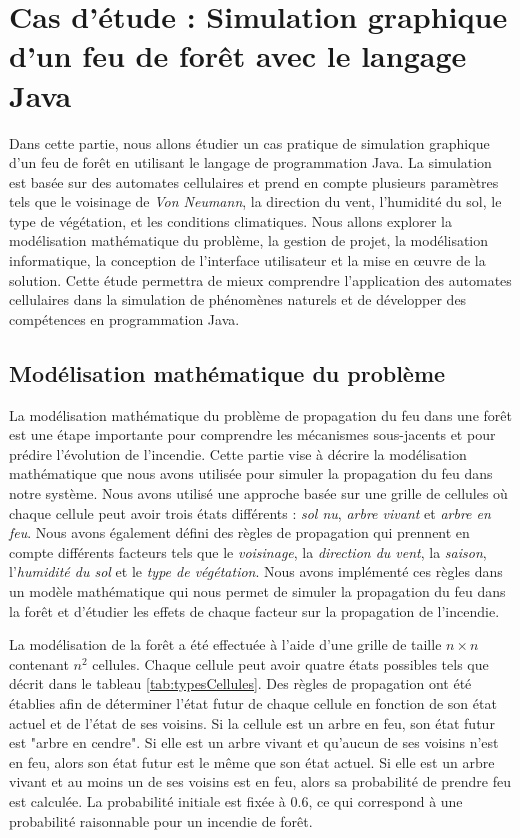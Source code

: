 \section{Cas d’étude : Simulation graphique d’un feu de forêt avec le langage Java}

Dans cette partie, nous allons étudier un cas pratique de simulation graphique d'un feu de forêt en utilisant le langage de programmation Java. La simulation est basée sur des automates cellulaires et prend en compte plusieurs paramètres tels que le voisinage de \textit{Von Neumann}, la direction du vent, l'humidité du sol, le type de végétation, et les conditions climatiques. Nous allons explorer la modélisation mathématique du problème, la gestion de projet, la modélisation informatique, la conception de l'interface utilisateur et la mise en œuvre de la solution. Cette étude permettra de mieux comprendre l'application des automates cellulaires dans la simulation de phénomènes naturels et de développer des compétences en programmation Java.

\subsection{Modélisation mathématique du problème}
\label{sec:modélisationMath}

La modélisation mathématique du problème de propagation du feu dans une forêt est une étape importante pour comprendre les mécanismes sous-jacents et pour prédire l'évolution de l'incendie. Cette partie vise à décrire la modélisation mathématique que nous avons utilisée pour simuler la propagation du feu dans notre système. Nous avons utilisé une approche basée sur une grille de cellules où chaque cellule peut avoir trois états différents : \textit{sol nu}, \textit{arbre vivant} et \textit{arbre en feu}. Nous avons également défini des règles de propagation qui prennent en compte différents facteurs tels que le \textit{voisinage}, la \textit{direction du vent}, la \textit{saison}, l'\textit{humidité du sol} et le \textit{type de végétation}. Nous avons implémenté ces règles dans un modèle mathématique qui nous permet de simuler la propagation du feu dans la forêt et d'étudier les effets de chaque facteur sur la propagation de l'incendie. 

La modélisation de la forêt a été effectuée à l'aide d'une grille de taille $n \times n$ contenant $n^2$ cellules. Chaque cellule peut avoir quatre états possibles tels que décrit dans le tableau \ref{tab:typesCellules}. Des règles de propagation ont été établies afin de déterminer l'état futur de chaque cellule en fonction de son état actuel et de l'état de ses voisins. Si la cellule est un arbre en feu, son état futur est "arbre en cendre". Si elle est un arbre vivant et qu'aucun de ses voisins n'est en feu, alors son état futur est le même que son état actuel. Si elle est un arbre vivant et au moins un de ses voisins est en feu, alors sa probabilité de prendre feu est calculée. La probabilité initiale est fixée à $0.6$, ce qui correspond à une probabilité raisonnable pour un incendie de forêt.

